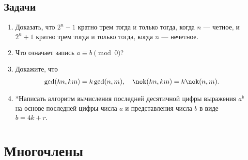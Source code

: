 \subsection*{Задачи}

\begin{enumerate}
\item Доказать, что $2^n-1$ кратно трем тогда и только тогда, когда $n$ --- четное, и $2^n+1$ кратно трем тогда и только тогда, когда $n$ --- нечетное.
\item Что означает запись $a\equiv b\pmod 0$?
\item Докажите, что
$$
\gcd(kn,km)=k\gcd(n,m),\quad \nok(kn,km)=k\nok(n,m).
$$
\item *Написать алгоритм вычисления последней десятичной цифры выражения $a^b$ на основе последней цифры числа $a$ и представления числа $b$ в виде $b=4k+r$.
\end{enumerate}



\section{Многочлены}




